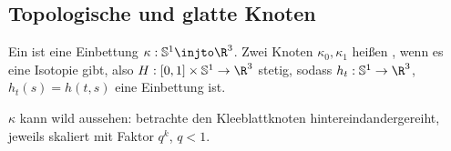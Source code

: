 \subsection{Topologische und glatte Knoten}

\begin{df}
    Ein  ist eine Einbettung $\kappa: \S^1 \injto \R^3$.
    Zwei Knoten $\kappa_0, \kappa_1$ heißen , wenn es eine Isotopie gibt, also $H: [0,1] \times \S^1 \to \R^3$ stetig, sodass $h_t: \S^1 \to \R^3$, $h_t(s) = h(t,s)$ eine Einbettung ist.
\end{df}

\begin{note}
    $\kappa$ kann wild aussehen: betrachte den Kleeblattknoten hintereindandergereiht, jeweils skaliert mit Faktor $q^k$, $q < 1$.
\end{note}


